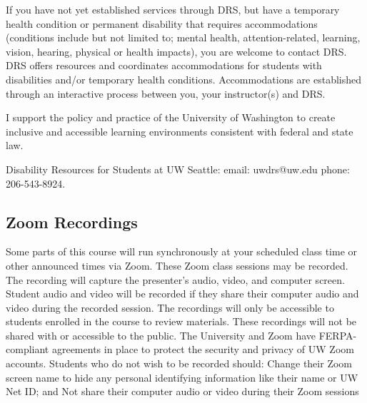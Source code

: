 \documentclass{article}	%
\begin{document}
If you have not yet established services through DRS, but have a temporary health condition or permanent disability that requires accommodations (conditions include but not limited to; mental health, attention-related, learning, vision, hearing, physical or health impacts), you are welcome to contact DRS. DRS offers resources and coordinates accommodations for students with disabilities and/or temporary health conditions.  Accommodations are established through an interactive process between you, your instructor(s) and DRS.  

I support the policy and practice of the University of Washington to create inclusive and accessible learning environments consistent with federal and state law. 
  
Disability Resources for Students at UW Seattle: email: uwdrs@uw.edu phone: 206-543-8924.

\subsection{Zoom Recordings}
Some parts of this course will run synchronously at your scheduled class time or other announced times via Zoom. These Zoom class sessions may be recorded. The recording will capture the presenter’s audio, video, and computer screen. Student audio and video will be recorded if they share their computer audio and video during the recorded session. The recordings will only be accessible to students enrolled in the course to review materials. These recordings will not be shared with or accessible to the public.  The University and Zoom have FERPA-compliant agreements in place to protect the security and privacy of UW Zoom accounts.
Students who do not wish to be recorded should:
Change their Zoom screen name to hide any personal identifying information like their name or UW Net ID; and
Not share their computer audio or video during their Zoom sessions


\end{document}
